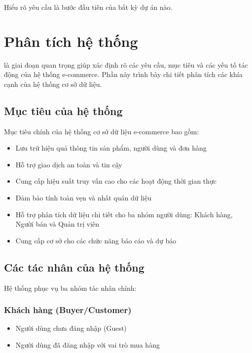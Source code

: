 
\begin{savequote}[75mm]
Hiểu rõ yêu cầu là bước đầu tiên của bất kỳ dự án nào.
\end{savequote}

\chapter{Phân tích hệ thống}

 là giai đoạn quan trọng giúp xác định rõ các yêu cầu, mục tiêu và các yếu tố tác động của hệ thống e-commerce. Phần này trình bày chi tiết phân tích các khía cạnh của hệ thống cơ sở dữ liệu.

\section{Mục tiêu của hệ thống}

Mục tiêu chính của hệ thống cơ sở dữ liệu e-commerce bao gồm:

\begin{itemize}
    \item Lưu trữ hiệu quả thông tin sản phẩm, người dùng và đơn hàng
    \item Hỗ trợ giao dịch an toàn và tin cậy
    \item Cung cấp hiệu suất truy vấn cao cho các hoạt động thời gian thực
    \item Đảm bảo tính toàn vẹn và nhất quán dữ liệu
    \item Hỗ trợ phân tích dữ liệu chi tiết cho ba nhóm người dùng: Khách hàng, Người bán và Quản trị viên
    \item Cung cấp cơ sở cho các chức năng báo cáo và dự báo
\end{itemize}

\section{Các tác nhân của hệ thống}

Hệ thống phục vụ ba nhóm tác nhân chính:

\subsection{Khách hàng (Buyer/Customer)}
\begin{itemize}
    \item Người dùng chưa đăng nhập (Guest)
    \item Người dùng đã đăng nhập với vai trò mua hàng
\end{itemize}

